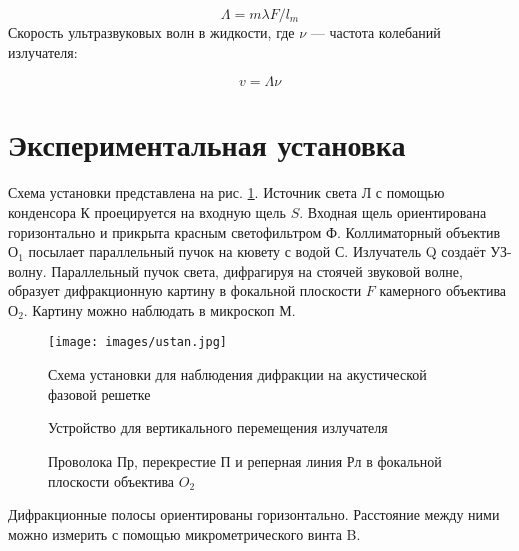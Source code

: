 \documentclass[a4paper,12pt]{article}
\begin{document}
\begin{equation}\label{}
 \Lambda = m \lambda F/ l_m 
\end{equation}
Скорость ультразвуковых волн в жидкости, где $ \nu $ --- частота колебаний излучателя:

\begin{equation}\label{}
	v = \Lambda \nu 
\end{equation}

\section{Экспериментальная установка}

Схема установки представлена на рис. \ref{pic:ustan}. Источник света Л с помощью конденсора К проецируется на входную щель $S$. Входная щель ориентирована горизонтально и прикрыта красным светофильтром Ф. Коллиматорный объектив $\text{О}_1$ посылает параллельный пучок на кювету с водой $С$. Излучатель Q создаёт УЗ-волну. Параллельный пучок света, дифрагируя на стоячей звуковой волне, образует дифракционную картину в фокальной плоскости $F$ камерного объектива $\text{О}_{2}$. Картину можно наблюдать в микроскоп М.

\FloatBarrier
\begin{figure}[!h]
	\centering
	\texttt{[image: images/ustan.jpg]}
	\caption{Схема установки для наблюдения дифракции на акустической фазовой решетке}
	\label{pic:ustan}
\end{figure}
\FloatBarrier



\FloatBarrier
\begin{figure}[h]
    \begin{minipage}[h]{0.5\linewidth}
        \caption{Устройство для вертикального перемещения излучателя}
        \label{pic:vertical-move-ustan}
    \end{minipage}
    \begin{minipage}[h]{0.5\linewidth}
        \caption{Проволока Пр, перекрестие П и реперная линия Рл в фокальной плоскости объектива $O_2$}
        \label{pic:cross}
    \end{minipage}
\end{figure}
\FloatBarrier

Дифракционные полосы ориентированы горизонтально. Расстояние между ними можно измерить с помощью микрометрического винта B.
\end{document}
